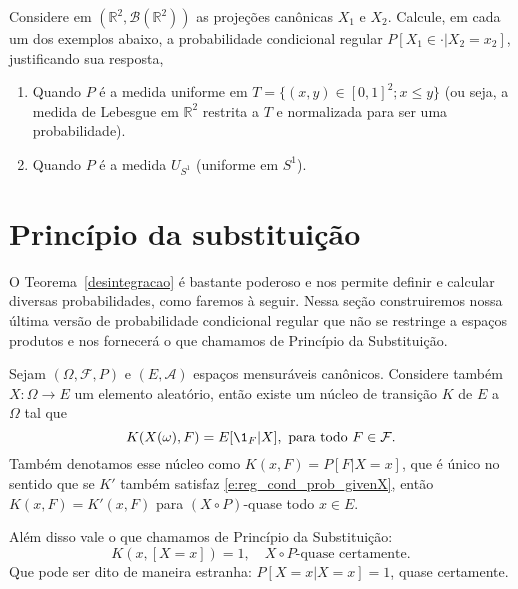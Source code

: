 \begin{exercise}
  Considere em $(\mathbb{R}^2, \mathcal{B}(\mathbb{R}^2))$ as projeções canônicas $X_1$ e $X_2$.
  Calcule, em cada um dos exemplos abaixo, a probabilidade condicional regular $P[X_1 \in \cdot|X_2 = x_2]$, justificando sua resposta,
  \begin{enumerate}[\quad a)]
  \item Quando $P$ é a medida uniforme em $T = \{(x,y) \in [0,1]^2; x \leq y\}$ (ou seja, a medida de Lebesgue em $\mathbb{R}^2$ restrita a $T$ e normalizada para ser uma probabilidade).
  \item Quando $P$ é a medida $U_{S^1}$ (uniforme em $S^1$).
  \end{enumerate}
\end{exercise}

\section{Princípio da substituição}

O Teorema~\ref{desintegracao} é bastante poderoso e nos permite definir e calcular diversas probabilidades, como faremos à seguir.
Nessa seção construiremos nossa última versão de probabilidade condicional regular que não se restringe a espaços produtos e nos fornecerá o que chamamos de Princípio da Substituição. 

\begin{theorem}
  \label{t:princ_substit}
  Sejam $(\Omega, \mathcal{F}, P)$ e $(E, \mathcal{A})$ espaços mensuráveis canônicos.
  Considere também $X: \Omega \to E$ um elemento aleatório, então existe um núcleo de transição $K$ de $E$ a $\Omega$ tal que
  \begin{equation}
    \label{e:reg_cond_prob_givenX}
    K(X(\omega), F) = E[\1_{F} | X], \text{ para todo $F \in \mathcal{F}$}.
  \end{equation}
  Também denotamos esse núcleo como $K(x, F) = P[F | X = x]$, que é único no sentido que se $K'$ também satisfaz \eqref{e:reg_cond_prob_givenX}, então $K(x, F) = K'(x, F)$ para $(X \circ P)$-quase todo $x \in E$.

  Além disso vale o que chamamos de Princípio da Substituição:
  \begin{equation}
    \label{e:princ_substit}
    K(x, [X = x]) = 1, \quad \text{$X \circ P$-quase certamente}.
  \end{equation}
  Que pode ser dito de maneira estranha: $P[X = x|X = x] = 1$, quase certamente.
\end{theorem}

